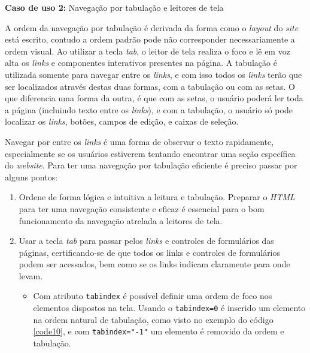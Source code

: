 {
\vspace{1.5cm}
{\centerline{\textbf{Caso de uso 2:}  Navegação por tabulação e leitores de tela}}

A ordem da navegação por tabulação é derivada da forma como o \textit{layout} do \textit{site} está escrito, contudo a ordem padrão pode não corresponder necessariamente a ordem visual. Ao utilizar a tecla \textit{tab}, o leitor de tela realiza o foco e lê em voz alta os \textit{links} e componentes interativos presentes na página.  A tabulação é utilizada somente para navegar entre os \textit{links}, e com isso todos os \textit{links} terão que ser localizados através destas duas formas, com a tabulação ou com as setas. O que diferencia uma forma da outra, é que com as setas, o usuário poderá ler toda a página (incluindo texto entre os \textit{links}), e com a tabulação, o usuário só pode localizar os \textit{links}, botões, campos de edição, e caixas de seleção.

Navegar por entre os \textit{links} é uma forma de observar o texto rapidamente, especialmente se os usuários estiverem tentando encontrar uma seção específica do \textit{website}. Para ter uma navegação por tabulação eficiente é preciso passar por alguns pontos: 
\begin{enumerate}
    \item Ordene de forma lógica e intuitiva a leitura e tabulação. Preparar o \textit{HTML}\cite{HTML} para ter uma navegação consistente e eficaz é essencial para o bom funcionamento da navegação atrelada a leitores de tela. 
    \item Usar a tecla \textit{tab} para passar pelos \textit{links} e controles de formulários
    das páginas, certificando-se de que todos os links e controles de formulários podem ser acessados, bem como se os links indicam claramente para onde levam. 
    
    \begin{itemize}
        \item Com atributo \lstinline{tabindex} é possível definir uma ordem de foco nos elementos dispostos na tela. Usando o \lstinline{tabindex=0} é inserido um elemento na ordem natural de tabulação, como visto no exemplo do código \ref{code10}, e com \lstinline{tabindex="-1"} um elemento é removido da ordem e tabulação.


\end{itemize}
\end{enumerate}}
